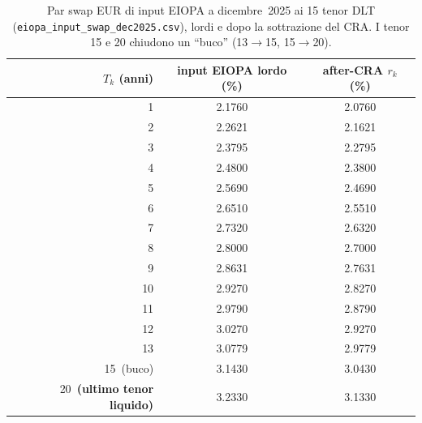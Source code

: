 \begin{table}[H]\centering\small
\caption{Par swap EUR di input EIOPA a dicembre~2025 ai 15 tenor DLT (\texttt{eiopa\_input\_swap\_dec2025.csv}), lordi e dopo la sottrazione del CRA. I tenor 15 e 20 chiudono un ``buco'' (13$\to$15, 15$\to$20).}
\label{tab:input-dic}\renewcommand{\arraystretch}{1.15}
\begin{tabular}{rcc}
\toprule
$T_k$ (anni) & input EIOPA lordo (\%) & after-CRA $r_k$ (\%)\\
\midrule
\rowcolor{rowtint}1 & 2.1760 & 2.0760\\
2 & 2.2621 & 2.1621\\
\rowcolor{rowtint}3 & 2.3795 & 2.2795\\
4 & 2.4800 & 2.3800\\
\rowcolor{rowtint}5 & 2.5690 & 2.4690\\
6 & 2.6510 & 2.5510\\
\rowcolor{rowtint}7 & 2.7320 & 2.6320\\
8 & 2.8000 & 2.7000\\
\rowcolor{rowtint}9 & 2.8631 & 2.7631\\
10 & 2.9270 & 2.8270\\
\rowcolor{rowtint}11 & 2.9790 & 2.8790\\
12 & 3.0270 & 2.9270\\
\rowcolor{rowtint}13 & 3.0779 & 2.9779\\
15~(buco) & 3.1430 & 3.0430\\
\rowcolor{rowtint}20~\textbf{(ultimo tenor liquido)} & 3.2330 & 3.1330\\
\bottomrule
\end{tabular}
\end{table}
